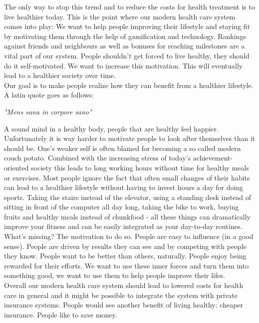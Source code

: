 \documentclass[a4paper,11pt]{article}
\begin{document}
The only way to stop this trend and to reduce the costs for health treatment is to live healthier today. This is the point where our modern health care system comes into play: We want to help people improving their lifestyle and staying fit by motivating them through the help of gamification and technology. Rankings against friends and neighbours as well as bonuses for reaching milestones are a vital part of our system. People shouldn't get forced to live healthy, they should do it self-motivated. We want to increase this motivation. This will eventually lead to a healthier society over time.  \\

Our goal is to make people realize how they can benefit from a healthier lifestyle. A latin quote goes as follows:

\begin{center}
	\emph{"Mens sana in corpore sano"}
\end{center}

A sound mind in a healthy body, people that are healthy feel happier. Unfortunately it is way harder to motivate people to look after themselves than it should be. One's weaker self is often blamed for becoming a so called modern couch potato. Combined with the increasing stress of today's achievement-oriented society this leads to long working hours without time for healthy meals or exercises. Most people ignore the fact that often small changes of their habits can lead to a healthier lifestyle without having to invest hours a day for doing sports. Taking the stairs instead of the elevator, using a standing desk instead of sitting in front of the computer all day long, taking the bike to work, buying fruits and healthy meals instead of chunkfood - all these things can dramatically improve your fitness and can be easily integrated as your day-to-day routines. What's missing? The motivation to do so. People are easy to influence (in a good sense). People are driven by results they can see and by competing with people they know. People want to be better than others, naturally. People enjoy being rewarded for their efforts. We want to use these inner forces and turn them into something good, we want to use them to help people improve their lifes. \\

Overall our modern health care system should lead to lowered costs for health care in general and it might be possible to integrate the system with private insurance systems. People would see another benefit of living healthy: cheaper insurance. People like to save money. \\
\end{document}
